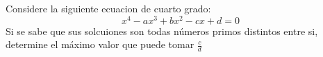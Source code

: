 \begin{problem}
    Considere la siguiente ecuacion de cuarto grado: 
    \[ x^4-ax^3+bx^2-cx+d=0\]
    Si se sabe que sus solcuiones son todas n\'umeros primos distintos entre si, determine el m\'aximo valor que puede 
    tomar $\frac cd$
    
    \label{24JALTSTAC31}
\end{problem}